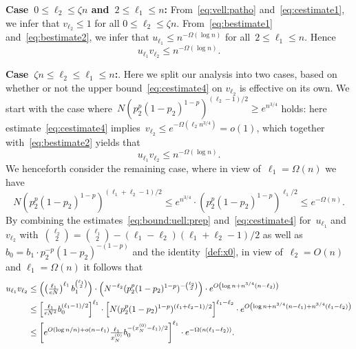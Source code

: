 \documentclass{article}
\newcommand\lrpar[1]{\left(#1\right)}
\renewcommand{\u}{u}
\renewcommand{\v}{v}
\newcommand\Bigpar[1]{\Bigl(#1\Bigr)}
\newcommand\lrsqpar[1]{\left[#1\right]}
\begin{document}
\textbf{Case~$0 \le \ell_2\le \zeta n$ and~$2 \le \ell_1 \le n$:} 
From~\eqref{eq:vell:patho} and~\eqref{eq:cestimate1}, we infer that $v_{\ell_2}\le 1$ for all $0 \le \ell_2\le \zeta n$. 
From~\eqref{eq:bestimate1} and~\eqref{eq:bestimate2}, we infer that $u_{\ell_1}\le n^{-\Omega(\log n)}$ for all~$2 \le \ell_1 \le n$. Hence
\begin{equation}\label{eq:bound:uv:1}
\u_{\ell_1}\v_{\ell_2} \le n^{-\Omega(\log n)}.
\end{equation}

\textbf{Case~$\zeta n\le \ell_2 \le \ell_1\le n$:}.
Here we split our analysis into two cases, based on whether or not the upper bound~\eqref{eq:cestimate4} on $v_{\ell_2}$ is effective on its own. 
We start with the case where~$N(p_2^p(1-p_2)^{1-p})^{
(\ell_2-1)/2}\ge e^{n^{3/4}}$ holds: here estimate~\eqref{eq:cestimate4} implies~$\v_{\ell_2}\le e^{-\Omega(\ell_2n^{3/4})}=o(1)$, which together with~\eqref{eq:bestimate2} 
yields that
\begin{equation}\label{eq:bound:uv:2}
\u_{\ell_1}\v_{\ell_2}
\leq n^{-\Omega(\log n)}.
\end{equation}
We henceforth consider the remaining case, where in view of~$\ell_1 = \Omega(n)$ we have 
\begin{equation*}N(p_2^p(1-p_2)^{1-p})^{
(\ell_1+\ell_2-1)/2}\le e^{n^{3/4}} \cdot (p_2^p(1-p_2)^{1-p})^{\ell_1/2}\le  e^{-\Omega(n)} .
\end{equation*}
By combining the estimates~\eqref{eq:bound:uell:prep} and~\eqref{eq:cestimate4} for~$\u_{\ell_1}$ and~$\v_{\ell_2}$ with~$\binom{\ell_2}{2}={\binom{\ell_1}{2}-(\ell_1-\ell_2)(\ell_1+\ell_2-1)/2}$ as well as~$b_0 = {b_1 \cdot p_2^{-p}(1-p_2)^{-(1-p)}}$ and the identity~\eqref{def:x0}, 
in view of~$\ell_2=O(n)$ and $\ell_1 = \Omega(n)$ it follows that 
\begin{equation*}\begin{split}
    \u_{\ell_1} \v_{\ell_2}&\le \Bigpar{\lrpar{\tfrac{\ell_1}{eN}}^{\ell_1}  b_1^{\binom{\ell_1}{2}}}
 \cdot \Bigpar{ N^{-\ell_2} (p_2^p(1-p_2)^{1-p})^{-\binom{\ell_2}{2}}} \cdot e^{O\lrpar{\log n + n^{3/4}(n-\ell_2)}} \\
    &\le \lrsqpar{ \tfrac{\ell_1}{eN^2} b_0^{(\ell_1-1)/2}  }^{\ell_1} \cdot \lrsqpar{N(p_2^p(1-p_2)^{1-p})^{(\ell_1+\ell_2-1)/2}}^{\ell_1-\ell_2} \cdot e^{O\lrpar{\log n +n^{3/4}(n-\ell_1) + n^{3/4}(\ell_1-\ell_2)}}  \\
    &\leq \lrsqpar{e^{O(\log n/n)+o(n-\ell_1)}\tfrac{\ell_1}{x^{(0)}_N} b_0^{-(x^{(0)}_N-\ell_1)/2}}^{\ell_1} \cdot e^{-\Omega(n(\ell_1-\ell_2))} .
\end{split}
\end{equation*}
\end{document}
